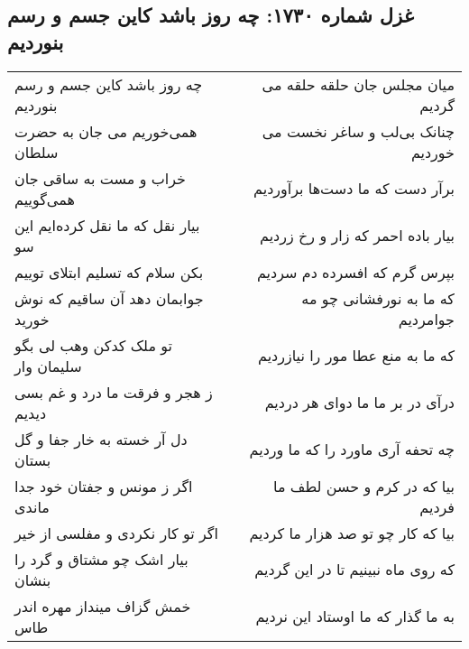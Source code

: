 \begin{center}
\section*{غزل شماره ۱۷۳۰: چه روز باشد کاین جسم و رسم بنوردیم}
\label{sec:1730}
\begin{longtable}{l p{0.5cm} r}
چه روز باشد کاین جسم و رسم بنوردیم
&&
میان مجلس جان حلقه حلقه می گردیم
\\
همی‌خوریم می جان به حضرت سلطان
&&
چنانک بی‌لب و ساغر نخست می خوردیم
\\
خراب و مست به ساقی جان همی‌گوییم
&&
برآر دست که ما دست‌ها برآوردیم
\\
بیار نقل که ما نقل کرده‌ایم این سو
&&
بیار باده احمر که زار و رخ زردیم
\\
بکن سلام که تسلیم ابتلای توییم
&&
بپرس گرم که افسرده دم سردیم
\\
جوابمان دهد آن ساقیم که نوش خورید
&&
که ما به نورفشانی چو مه جوامردیم
\\
تو ملک کدکن وهب لی بگو سلیمان وار
&&
که ما به منع عطا مور را نیازردیم
\\
ز هجر و فرقت ما درد و غم بسی دیدیم
&&
درآی در بر ما ما دوای هر دردیم
\\
دل آر خسته به خار جفا و گل بستان
&&
چه تحفه آری ماورد را که ما وردیم
\\
اگر ز مونس و جفتان خود جدا ماندی
&&
بیا که در کرم و حسن لطف ما فردیم
\\
اگر تو کار نکردی و مفلسی از خیر
&&
بیا که کار چو تو صد هزار ما کردیم
\\
بیار اشک چو مشتاق و گرد را بنشان
&&
که روی ماه نبینیم تا در این گردیم
\\
خمش گزاف مینداز مهره اندر طاس
&&
به ما گذار که ما اوستاد این نردیم
\\
\end{longtable}
\end{center}
